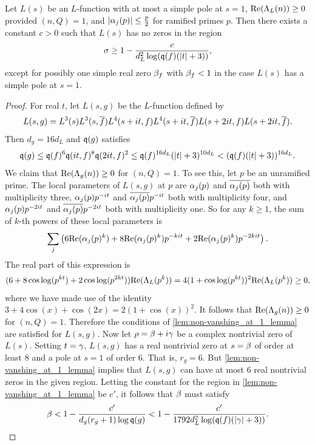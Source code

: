 \documentclass[12pt]{article}
\begin{document}
    \begin{theorem}\label{thm:zero_free_region_generic}
      Let \(L(s)\) be an \(L\)-function with at most a simple pole at \(s = 1\), \(\mathrm{Re}(\Lambda_{L}(n)) \ge 0\) provided \((n,Q) = 1\), and \(|\alpha_{j}(p)| \le \frac{p}{2}\) for ramified primes \(p\). Then there exists a constant \(c > 0\) such that \(L(s)\) has no zeros in the region
      \[
        \sigma \ge 1-\frac{c}{d_{L}^{2}\log(\mathfrak{q}(f)(|t|+3))},
      \]
      except for possibly one simple real zero \(\beta_{f}\) with \(\beta_{f} < 1\) in the case \(L(s)\) has a simple pole at \(s = 1\).
    \end{theorem}
    \begin{proof}
      For real \(t\), let \(L(s,g)\) be the \(L\)-function defined by
      \[
        L(s,g) = L^{3}(s)L^{3}(s,\overline{f})L^{4}(s+it,f)L^{4}(s+it,\overline{f})L(s+2it,f)L(s+2it,\overline{f}).
      \]
      Then \(d_{g} = 16d_{L}\) and \(\mathfrak{q}(g)\) satisfies
      \[
        \mathfrak{q}(g) \le \mathfrak{q}(f)^{6}\mathfrak{q}(it,f)^{8}\mathfrak{q}(2it,f)^{2} \le \mathfrak{q}(f)^{16d_{L}}(|t|+3)^{10d_{L}} < (\mathfrak{q}(f)(|t|+3))^{16d_{L}}.
      \]
      We claim that \(\mathrm{Re}(\Lambda_{g}(n)) \ge 0\) for \((n,Q) = 1\). To see this, let \(p\) be an unramified prime. The local parameters of \(L(s,g)\) at \(p\) are \(\alpha_{j}(p)\) and \(\overline{\alpha_{j}(p)}\) both with multiplicity three, \(\alpha_{j}(p)p^{-it}\) and \(\overline{\alpha_{j}(p)}p^{-it}\) both with multiplicity four, and \(\alpha_{j}(p)p^{-2it}\) and \(\overline{\alpha_{j}(p)}p^{-2it}\) both with multiplicity one. So for any \(k \ge 1\), the sum of \(k\)-th powers of these local parameters is
      \[
       \sum_{j}\left(6\mathrm{Re}(\alpha_{j}(p)^{k})+8\mathrm{Re}(\alpha_{j}(p)^{k})p^{-kit}+2\mathrm{Re}(\alpha_{j}(p)^{k})p^{-2kit}\right).
      \]
      The real part of this expression is
      \[
         (6+8\cos\log(p^{kt})+2\cos\log(p^{2kt}))\mathrm{Re}(\Lambda_{L}(p^{k})) = 4(1+\cos\log(p^{kt}))^{2}\mathrm{Re}(\Lambda_{L}(p^{k})) \ge 0,
      \]
      where we have made use of the identity \(3+4\cos(x)+\cos(2x) = 2(1+\cos(x))^{2}\). It follows that \(\mathrm{Re}(\Lambda_{g}(n)) \ge 0\) for \((n,Q) = 1\). Therefore the conditions of \cref{lem:non-vanshing_at_1_lemma} are satisfied for \(L(s,g)\). Now let \(\rho = \beta+i\gamma\) be a complex nontrivial zero of \(L(s)\). Setting \(t = \gamma\), \(L(s,g)\) has a real nontrivial zero at \(s = \beta\) of order at least \(8\) and a pole at \(s = 1\) of order \(6\). That is, \(r_{g} = 6\). But \cref{lem:non-vanshing_at_1_lemma} implies that \(L(s,g)\) can have at most \(6\) real nontrivial zeros in the given region. Letting the constant for the region in \cref{lem:non-vanshing_at_1_lemma} be \(c'\), it follows that \(\beta\) must satisfy
      \[
        \beta < 1-\frac{c'}{d_{g}(r_{g}+1)\log{\mathfrak{q}(g)}} < 1-\frac{c'}{1792d_{L}^{2}\log(\mathfrak{q}(f)(|\gamma|+3))}.
      \]
  

\end{proof}
\end{document}
